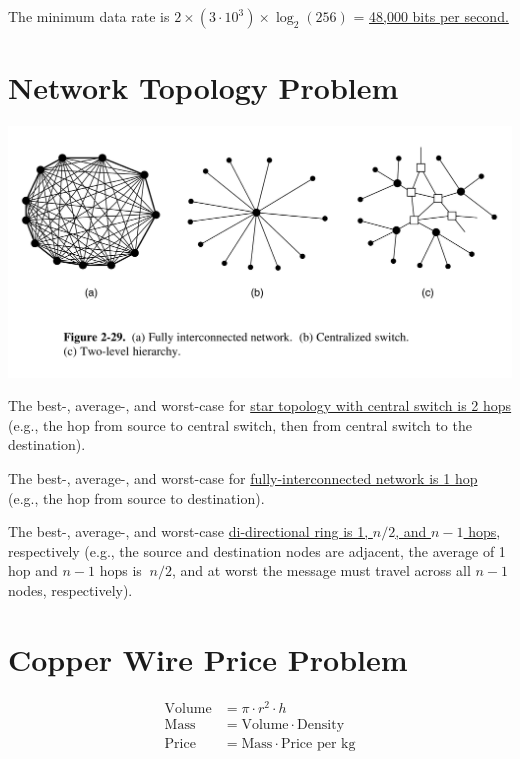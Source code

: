 The minimum data rate is $2 \times (3 \cdot 10^3) \times \log_2(256)$ = \ul{48,000 bits per second.}




\section{Network Topology Problem}

\includegraphics[width=\the\columnwidth]{network-topologies.png}

The best-, average-, and worst-case for \ul{star topology with central switch is 2 hops} (e.g., the hop from source to central switch, then from central switch to the destination).

The best-, average-, and worst-case for \ul{fully-interconnected network is 1 hop} (e.g., the hop from source to destination).

The best-, average-, and worst-case \ul{di-directional ring is 1, $n / 2$, and $n - 1$ hops}, respectively (e.g., the source and destination nodes are adjacent, the average of 1 hop and $n - 1$ hops is $~ n/2$, and at worst the message must travel across all $n - 1$ nodes, respectively).

\section{Copper Wire Price Problem}
\begin{align*}
	\text{Volume} &= \pi \cdot r^2 \cdot h \\
	\text{Mass} &= \text{Volume} \cdot \text{Density} \\
	\text{Price} &= \text{Mass} \cdot \text{Price per kg}
\end{align*}

